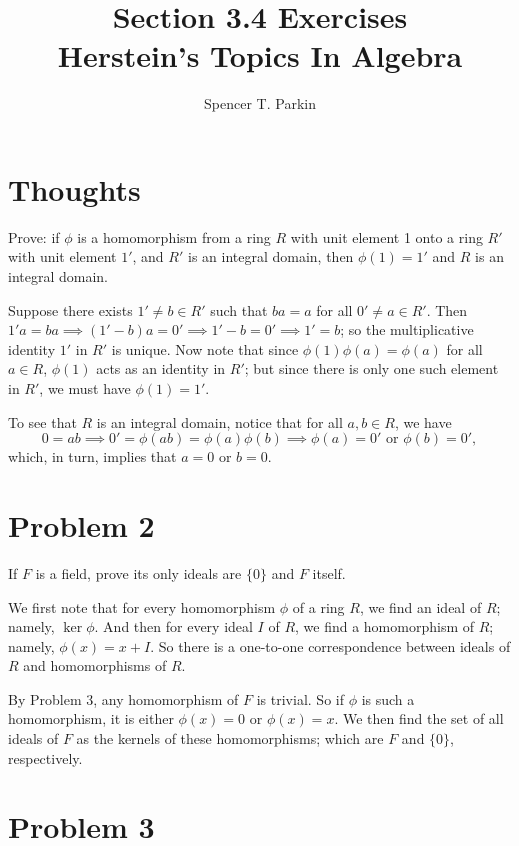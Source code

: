 \documentclass[12pt]{article}
\title{Section 3.4 Exercises\\Herstein's Topics In Algebra}
\author{Spencer T. Parkin}
\begin{document}
\maketitle

\section*{Thoughts}

Prove: if $\phi$ is a homomorphism from a ring $R$ with unit element 1 onto a ring $R'$ with
unit element $1'$, and $R'$ is an integral domain, then $\phi(1)=1'$ and $R$ is an integral domain.

Suppose there exists $1'\neq b\in R'$ such that $ba=a$ for all $0'\neq a\in R'$.
Then $1'a=ba\implies (1'-b)a=0'\implies 1'-b=0'\implies 1'=b$; so the multiplicative
identity $1'$ in $R'$ is unique.  Now note that since $\phi(1)\phi(a)=\phi(a)$ for all
$a\in R$, $\phi(1)$ acts as an identity in $R'$; but since there is only one such element in $R'$,
we must have $\phi(1)=1'$.

To see that $R$ is an integral domain, notice that for all $a,b\in R$, we have
\begin{equation*}
0=ab\implies 0'=\phi(ab)=\phi(a)\phi(b)\implies\mbox{$\phi(a)=0'$ or $\phi(b)=0'$},
\end{equation*}
which, in turn, implies that $a=0$ or $b=0$.

\section*{Problem 2}

If $F$ is a field, prove its only ideals are $\{0\}$ and $F$ itself.

We first note that for every homomorphism $\phi$ of a ring $R$, we find an ideal of $R$; namely, $\ker\phi$.
And then for every ideal $I$ of $R$, we find a homomorphism of $R$; namely, $\phi(x)=x+I$.
So there is a one-to-one correspondence between ideals of $R$ and homomorphisms of $R$.

By Problem 3, any homomorphism of $F$ is trivial.  So if $\phi$ is
such a homomorphism, it is either $\phi(x)=0$ or $\phi(x)=x$.
We then find the set of all ideals of $F$ as the kernels of these homomorphisms; which
are $F$ and $\{0\}$, respectively.

\section*{Problem 3}
\end{document}
